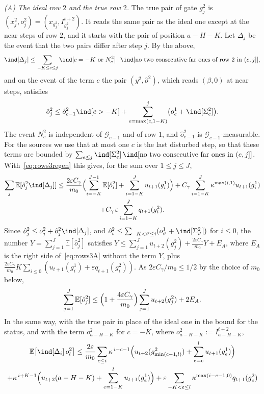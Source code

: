 \documentclass[11pt]{amsart}
\theoremstyle{definition}
\theoremstyle{remark}
\newcommand{\eps}{\varepsilon}
\newcommand{\EE}{\mathbb{E}}
\begin{document}
\emph{(A) The ideal row $2$ and the true row $2$.} The true pair of gate $g^2_j$ is
$(x^2_j,o^2_j)=(x_{g^2_j},I^{t+2}_{g^2_j})$. It reads the same pair as the ideal one except at the
near steps of row $2$, and it starts with the pair of position $a-H-K$. Let $\Delta_j$ be the
event that the two pairs differ after step $j$. By the above,
\begin{equation}\label{eq:rows3delta}
\ind[\Delta_j]\le\sum_{-K\le c\le j}\ind[c=-K\text{ or }N^2_c]\cdot\ind[\text{no two consecutive far ones of row }2\text{ in }(c,j]],
\end{equation}
and on the event of the term $c$ the pair $(y^2,\hat o^2)$, which reads $(\beta,0)$ at near steps,
satisfies
\[
\hat o^2_j\le\hat o^2_{c-1}\ind[c>-K]+\sum_{e=\max(c,1-K)}^{j}\bigl(o^1_e+\ind[\Sigma^2_e]\bigr).
\]
The event $N^2_c$ is independent of $\mathcal G_{c-1}$ and of row $1$, and $\hat o^2_{c-1}$ is
$\mathcal G_{c-1}$-measurable. For the sources we use that at most one $c$ is the last disturbed
step, so that these terms are bounded by $\sum_{e\le j}\ind[\Sigma^2_e]\,\ind[\text{no two
consecutive far ones in }(e,j]]$. With~\eqref{eq:rows3regen} this gives, for the sum over
$1\le j\le J$,
\begin{multline}\label{eq:rows3A}
\sum_j\EE[\hat o^2_j\ind[\Delta_j]]\le\frac{2\eps C_\gamma}{m_0}\Bigl(\sum_{i=-K}^{J-1}\EE[\hat o^2_i]+\sum_{i=1-K}^{J}u_{t+1}(g^1_i)\Bigr)
+C_\gamma\sum_{i=1-K}^{J}\kappa^{\max(i,1)}u_{t+1}(g^1_i)\\
+C_\gamma\,\eps\sum_{i=1-K}^{J}q_{t+1}(g^2_i).
\end{multline}
Since $\hat o^2_j\le o^2_j+\hat o^2_j\ind[\Delta_j]$, and $\hat o^2_i\le\sum_{-K<i'\le i}(o^1_{i'}+\ind[\Sigma^2_{i'}])$
for $i\le0$, the number $Y=\sum_{j=1}^{J}\EE[\hat o^2_j]$ satisfies
$Y\le\sum_{j=1}^Ju_{t+2}(g^2_j)+\frac{2\eps C_\gamma}{m_0}Y+E_A$, where $E_A$ is the right side
of~\eqref{eq:rows3A} without the term $Y$, plus
$\frac{2\eps C_\gamma}{m_0}K\sum_{i\le0}(u_{t+1}(g^1_i)+\eps q_{t+1}(g^2_i))$. As
$2\eps C_\gamma/m_0\le1/2$ by the choice of $m_0$ below,
\begin{equation}\label{eq:rows3Y}
\sum_{j=1}^{J}\EE[\hat o^2_j]\le\Bigl(1+\frac{4\eps C_\gamma}{m_0}\Bigr)\sum_{j=1}^{J}u_{t+2}(g^2_j)+2E_A .
\end{equation}
In the same way, with the true pair in place of the ideal one in the bound for the status, and
with the term $o^2_{a-H-K}$ for $c=-K$, where $o^2_{a-H-K}:=I^{t+2}_{a-H-K}$,
\begin{multline}\label{eq:rows3A2}
\EE\bigl[\ind[\Delta_i]\,o^2_l\bigr]\le\frac{2\eps}{m_0}\sum_{c\le i}\kappa^{\,i-c-1}\Bigl(u_{t+2}(g^2_{\min(c-1,l)})+\sum_{e=c}^{l}u_{t+1}(g^1_e)\Bigr)\\
+\kappa^{\,i+K-1}\Bigl(u_{t+2}(a-H-K)+\sum_{e=1-K}^{l}u_{t+1}(g^1_e)\Bigr)
+\eps\sum_{-K<e\le l}\kappa^{\max(i-e-1,0)}q_{t+1}(g^2_e)
\end{multline}
\end{document}
